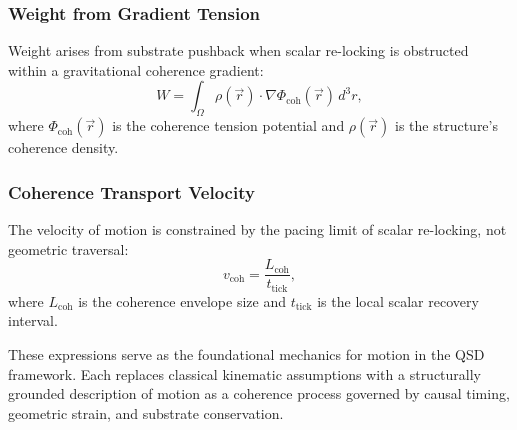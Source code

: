 \documentclass[entropy,article,submit,pdftex,moreauthors]{Definitions/mdpi}
\begin{document}
\subsubsection{Weight from Gradient Tension}
Weight arises from substrate pushback when scalar re-locking is obstructed within a gravitational coherence gradient:
\begin{equation}
    W = \int_{\Omega} \rho(\vec{r}) \cdot \nabla \Phi_{\text{coh}}(\vec{r}) \, d^3r,
\end{equation}
where \( \Phi_{\text{coh}}(\vec{r}) \) is the coherence tension potential and \( \rho(\vec{r}) \) is the structure’s coherence density.

\subsubsection{Coherence Transport Velocity}
The velocity of motion is constrained by the pacing limit of scalar re-locking, not geometric traversal:
\begin{equation}
    v_{\text{coh}} = \frac{L_{\text{coh}}}{t_{\text{tick}}},
\end{equation}
where \( L_{\text{coh}} \) is the coherence envelope size and \( t_{\text{tick}} \) is the local scalar recovery interval.

\vspace{1em}

These expressions serve as the foundational mechanics for motion in the QSD framework. Each replaces classical kinematic assumptions with a structurally grounded description of motion as a coherence process governed by causal timing, geometric strain, and substrate conservation.




\end{document}
